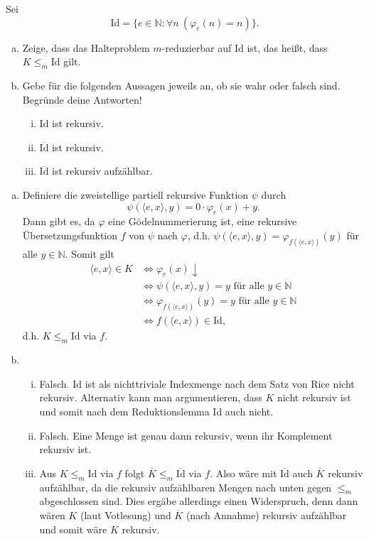 \documentclass[german,headsepline]{scrartcl}
\theoremstyle{definition}
\begin{document}
	\begin{question}[subtitle={Klausur 2012}]
		Sei
		\[\text{Id}=\{e\in\mathbb{N}\colon\forall n~(\varphi_e(n)=n)\}.\]
		\begin{enumerate}[(a)]
			\item Zeige, dass das Halteproblem $m$-reduzierbar auf Id ist, das heißt, dass $K\leq_m\text{Id}$ gilt.
			\item Gebe für die folgenden Aussagen jeweils an, ob sie wahr oder falsch sind.
				Begründe deine Antworten!
				\begin{enumerate}[(i)]
					\item Id ist rekursiv.
					\item $\overline{\text{Id}}$ ist rekursiv.
					\item $\overline{\text{Id}}$ ist rekursiv aufzählbar.
				\end{enumerate}
		\end{enumerate}
	\end{question}
	\begin{solution}
		\begin{enumerate}[(a)]
			\item Definiere die zweistellige partiell rekursive Funktion $\psi$ durch
				\[\psi(\langle e,x\rangle,y)=0\cdot\varphi_e(x)+y.\]
				Dann gibt es, da $\varphi$ eine Gödelnummerierung ist,
				eine rekursive Übersetzungsfunktion $f$ von $\psi$ nach $\varphi$,
				d.h. $\psi(\langle e,x\rangle,y)=\varphi_{f(\langle e,x\rangle)}(y)$ für alle $y\in\mathbb{N}$.
				Somit gilt
				\begin{align*}
					\langle e,x\rangle\in K &\Leftrightarrow \varphi_e(x)\downarrow \\
					&\Leftrightarrow \psi(\langle e,x\rangle,y)=y\text{ für alle }y\in\mathbb{N} \\
					&\Leftrightarrow \varphi_{f(\langle e,x\rangle)}(y)=y\text{ für alle }y\in\mathbb{N} \\
					&\Leftrightarrow f(\langle e,x\rangle)\in\text{Id},
				\end{align*}
				d.h. $K\leq_m\text{Id}$ via $f$.
			\item \begin{enumerate}[(i)]
				\item Falsch. Id ist als nichttriviale Indexmenge nach dem Satz von Rice nicht rekursiv.
					Alternativ kann man argumentieren, dass $K$ nicht rekursiv ist und somit nach dem Reduktionslemma Id auch nicht.
				\item Falsch. Eine Menge ist genau dann rekursiv, wenn ihr Komplement rekursiv ist.
				\item Aus $K\leq_m\text{Id}$ via $f$ folgt $\overline{K}\leq_m\overline{\text{Id}}$ via $f$.
					Also wäre mit $\overline{\text{Id}}$ auch $\overline{K}$ rekursiv aufzählbar,
					da die rekursiv aufzählbaren Mengen nach unten gegen $\leq_m$ abgeschlossen sind.
					Dies ergäbe allerdings einen Widerspruch,
					denn dann wären $K$ (laut Votlesung) und $\overline{K}$ (nach Annahme) rekursiv aufzählbar und somit wäre $K$ rekursiv.
			\end{enumerate}
		\end{enumerate}
	\end{solution}
	
\end{document}
